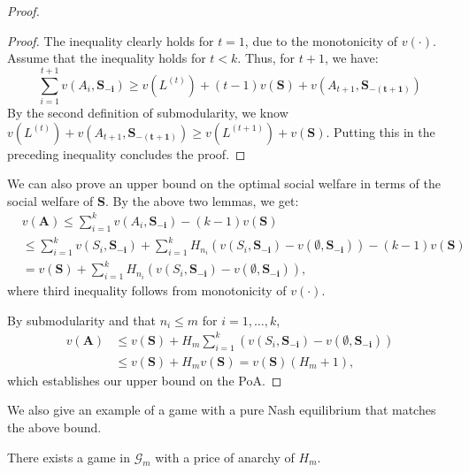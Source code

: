 \begin{proof}
\begin{proof}
  The inequality clearly holds for $t=1$, due to the monotonicity of
  $v(\cdot)$. Assume  that the inequality holds for $t<k$. Thus, for $t+1$,
  we have:
\small  \[ \sum_{i=1}^{t+1} v(A_i,\mathbf{S_{-i}}) \geq v(L^{(t)}) +
  (t-1)v(\mathbf{S}) + v(A_{t+1},\mathbf{S_{-(t+1)}})\]\normalsize
By the second definition of submodularity, we know $v(L^{(t)}) +
v(A_{t+1},\mathbf{S_{-(t+1)}}) \geq v(L^{(t+1)}) +v(\mathbf{S})$. Putting this in the preceding inequality concludes the proof.
\end{proof}
We can also prove an upper bound on the optimal social welfare in terms
of the social welfare of $\mathbf{S}$. By the above two lemmas, we
get:
\small
\begin{align*}
 & v(\mathbf{A}) \leq \sum_{i=1}^k v(A_i,\mathbf{S_{-i}})- (k-1)v(\mathbf{S})\\
& \leq \sum_{i=1}^kv(S_i,\mathbf{S_{-i}}) +
  \sum_{i=1}^k H_{n_i}(v(S_i,\mathbf{S_{-i}}) -
  v(\emptyset,\mathbf{S_{-i}})) - (k-1)v(\mathbf{S})\\ 
&= v(\mathbf{S})
  +\sum_{i=1}^k H_{n_i}(v(S_i,\mathbf{S_{-i}}) - v(\emptyset,\mathbf{S_{-i}})),
\end{align*}
\normalsize
where third inequality follows from monotonicity of
$v(\cdot)$.

By submodularity and that $n_i\leq m$ for $i=1,\ldots,k$, 
\small
\begin{align*}
  v(\mathbf{A}) &\leq v(\mathbf{S}) + H_{m}\sum_{i=1}^{k}(v(S_i,\mathbf{S_{-i}}) - v(\emptyset,\mathbf{S_{-i}})) \\
&\leq v(\mathbf{S}) + H_m v(\mathbf{S})= v(\mathbf{S})(H_m +1),
\end{align*}
\normalsize
which establishes our upper bound on the PoA. 
\end{proof}
We also give an example of a game with
a pure Nash equilibrium that matches the above bound.
\begin{theorem}
\label{prop:POA-lb}
There exists a game in $\mathcal{G}_{m}$ with a price of anarchy
  of $H_m$.
\end{theorem}
